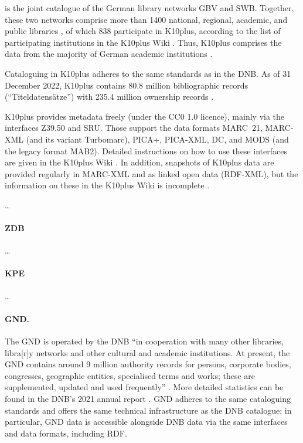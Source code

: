 is the joint catalogue of the German library networks GBV and SWB.
Together, these two networks comprise more than 1400 national, regional,
academic, and public libraries \autocite{BSZGBV,GBV_VZG},
of which 838 participate in \gls{K10plus}, according to the list of participating institutions
in the K10plus Wiki \autocite{K10plusWiki}. Thus, \gls{K10plus} comprises the data from
the majority of German academic institutions \autocite[cf.][]{BSZ_K10plus}.

Cataloguing in K10plus adheres to the same standards as in the DNB.
As of 31 December 2022, K10plus contains 80.8 million bibliographic records (\enquote{Titeldatensätze})
with 235.4 million ownership records \autocite{GBV_K10plus_Statistik}.

K10plus provides metadata freely (under the CC0 1.0 licence),
mainly via the interfaces Z39.50 and SRU.
Those support the data formats MARC~21, MARC-XML (and its variant Turbomarc),
PICA+, PICA-XML, \gls{DC}, and MODS (and the legacy format MAB2).
Detailed instructions on how to use these interfaces
are given in the K10plus Wiki \autocite{K10plusWiki}.
In addition, snapshots of K10plus data are provided regularly
in MARC-XML and as linked open data (RDF-XML), but the information
on these in the K10plus Wiki is incomplete \autocite{K10plusWikiOD}.



\dots




\paragraph{ZDB}

\dots

\paragraph{KPE}

\dots

\paragraph{GND.}

The \gls{GND} is operated by the \gls{DNB}
\enquote{in cooperation with many other libraries, libra[r]y networks and other cultural and academic institutions.
At present, the GND contains around 9 million authority records for persons, corporate bodies, congresses, geographic entities, specialised terms and works; these are supplemented, updated and used frequently} \autocite{DNB_cataloguing}. More detailed statistics can be found in the DNB's
2021 annual report \autocite[p.49]{DNB_Jahresbericht_2021}.
GND adheres to the same cataloguing standards and offers the same technical infrastructure
as the DNB catalogue; in particular, GND data is accessible alongside DNB data
via the same interfaces and data formats, including RDF.

